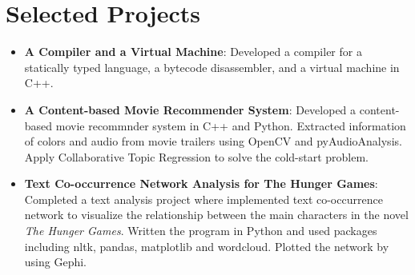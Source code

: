 \documentclass[letterpaper,11pt]{article}
\newcommand{\resumeItem}[2]{
  \item\small{
    \textbf{#1}{: #2 \vspace{-2pt}}
  }
}
\newcommand{\resumeSubItem}[2]{\resumeItem{#1}{#2}\vspace{-4pt}}
\newcommand{\resumeSubHeadingListStart}{\begin{itemize}[leftmargin=*]}
\newcommand{\resumeSubHeadingListEnd}{\end{itemize}}
\begin{document}
\section{Selected Projects}
  \resumeSubHeadingListStart
    \resumeSubItem{A Compiler and a Virtual Machine}
    {
        Developed a compiler for a statically typed language, a bytecode disassembler, and a virtual machine in C++.
    }
    \resumeSubItem{A Content-based Movie Recommender System}
    {
        Developed a content-based movie recommnder system in C++ and Python. Extracted information of colors and audio from movie trailers using OpenCV and pyAudioAnalysis. Apply Collaborative Topic Regression to solve the cold-start problem.
    }
    \resumeSubItem{Text Co-occurrence Network Analysis for The Hunger Games}
    {
	    Completed a text analysis project where implemented text co-occurrence network to visualize the relationship between the main characters in the novel \textit{The Hunger Games}. Written the program in Python and used packages including nltk, pandas, matplotlib and wordcloud. Plotted the network by using Gephi.
    }
  \resumeSubHeadingListEnd


\end{document}
